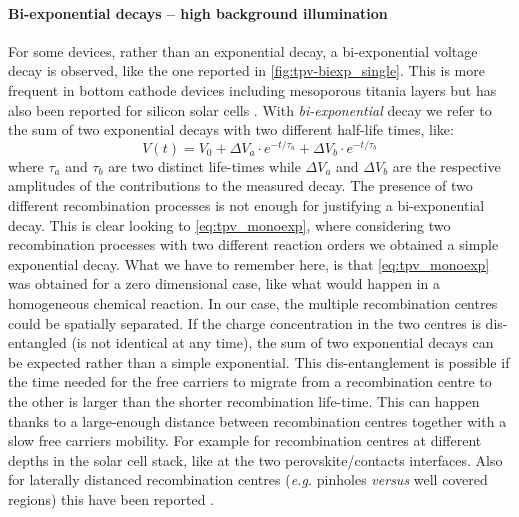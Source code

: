 	\paragraph{Bi-exponential decays -- high background illumination}
	For some devices, rather than an exponential decay, a bi-exponential voltage decay is observed, like the one reported in \cref{fig:tpv-biexp_single}.
	This is more frequent in bottom cathode devices including mesoporous titania layers \cite{Carnie2015,ORegan2015b} but has also been reported for silicon solar cells \cite{Kiermasch2018}.
	With \emph{bi-exponential} decay we refer to the sum of two exponential decays with two different half-life times, like:
	\begin{equation}\label{eq:tpv_biexp}
		V (t) = V_0 + \Delta V_a \cdot e^{-t/\tau_a} + \Delta V_b \cdot e^{-t/\tau_b}
	\end{equation}
	where $\tau_a$ and $\tau_b$ are two distinct life-times while $\Delta V_a$ and $\Delta V_b$ are the respective amplitudes of the contributions to the measured decay.
	The presence of two different recombination processes is not enough for justifying a bi-exponential decay.
	This is clear looking to \cref{eq:tpv_monoexp}, where considering two recombination processes with two different reaction orders we obtained a simple exponential decay.
	What we have to remember here, is that \cref{eq:tpv_monoexp} was obtained for a zero dimensional case, like what would happen in a homogeneous chemical reaction.
	In our case, the multiple recombination centres could be spatially separated.
	If the charge concentration in the two centres is dis-entangled (is not identical at any time), the sum of two exponential decays can be expected rather than a simple exponential.
	This dis-entanglement is possible if the time needed for the free carriers to migrate from a recombination centre to the other is larger than the shorter recombination life-time.
	This can happen thanks to a large-enough distance between recombination centres together with a slow free carriers mobility.
	For example for recombination centres at different depths in the solar cell stack, like at the two perovskite/contacts interfaces.
	Also for laterally distanced recombination centres (\textsl{e.g.} pinholes \textsl{versus} well covered regions) this have been reported \cite{Montcada2017}.

